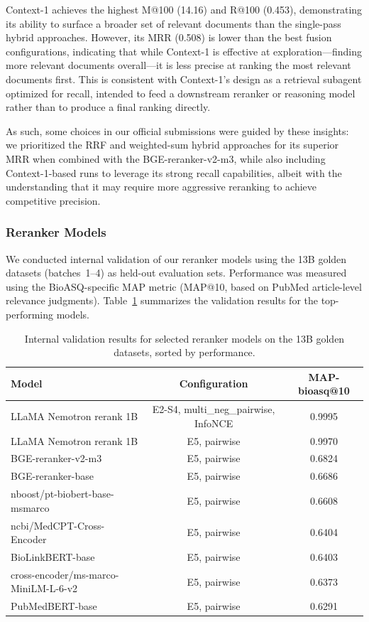 Context-1 achieves the highest M@100 (14.16) and R@100 (0.453), demonstrating its ability to surface a broader set of relevant documents than the single-pass hybrid approaches. However, its MRR (0.508) is lower than the best fusion configurations, indicating that while Context-1 is effective at exploration---finding more relevant documents overall---it is less precise at ranking the most relevant documents first. This is consistent with Context-1's design as a retrieval subagent optimized for recall, intended to feed a downstream reranker or reasoning model rather than to produce a final ranking directly.

As such, some choices in our official submissions were guided by these insights: we prioritized the RRF and weighted-sum hybrid approaches for its superior MRR when combined with the BGE-reranker-v2-m3, while also including Context-1-based runs to leverage its strong recall capabilities, albeit with the understanding that it may require more aggressive reranking to achieve competitive precision.

\subsubsection{Reranker Models}
\label{sec:internal-validation}

We conducted internal validation of our reranker models using the 13B golden datasets (batches~1--4) as held-out evaluation sets. Performance was measured using the BioASQ-specific MAP metric (MAP@10, based on PubMed article-level relevance judgments). Table~\ref{tab:reranker-val} summarizes the validation results for the top-performing models.

\begin{table}[ht]
  \centering
  \caption{Internal validation results for selected reranker models on the 13B golden datasets, sorted by performance.}
  \label{tab:reranker-val}
  \footnotesize
  \begin{tabular}{lcc}
    \toprule
    \textbf{Model} & \textbf{Configuration} & \textbf{MAP-bioasq@10} \\
    \midrule
    LLaMA Nemotron rerank 1B & E2-S4, multi\_neg\_pairwise, InfoNCE & 0.9995 \\
    LLaMA Nemotron rerank 1B & E5, pairwise & 0.9970 \\
    BGE-reranker-v2-m3 & E5, pairwise & 0.6824 \\
    BGE-reranker-base & E5, pairwise & 0.6686 \\
    nboost/pt-biobert-base-msmarco & E5, pairwise & 0.6608 \\
    ncbi/MedCPT-Cross-Encoder & E5, pairwise & 0.6404 \\
    BioLinkBERT-base & E5, pairwise & 0.6403 \\
    cross-encoder/ms-marco-MiniLM-L-6-v2 & E5, pairwise & 0.6373 \\
    PubMedBERT-base & E5, pairwise & 0.6291 \\
    \bottomrule
  \end{tabular}
\end{table}

